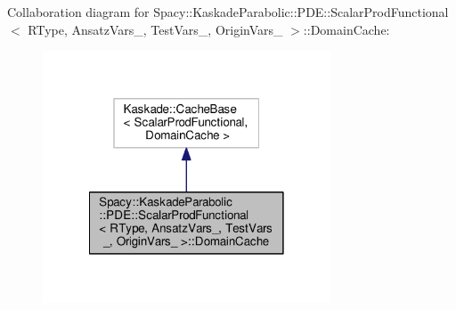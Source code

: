 Collaboration diagram for Spacy\-:\-:Kaskade\-Parabolic\-:\-:P\-D\-E\-:\-:Scalar\-Prod\-Functional$<$ R\-Type, Ansatz\-Vars\-\_\-, Test\-Vars\-\_\-, Origin\-Vars\-\_\- $>$\-:\-:Domain\-Cache\-:
\nopagebreak
\begin{figure}[H]
\begin{center}
\leavevmode
\includegraphics[width=242pt]{classSpacy_1_1KaskadeParabolic_1_1PDE_1_1ScalarProdFunctional_1_1DomainCache__coll__graph}
\end{center}
\end{figure}
